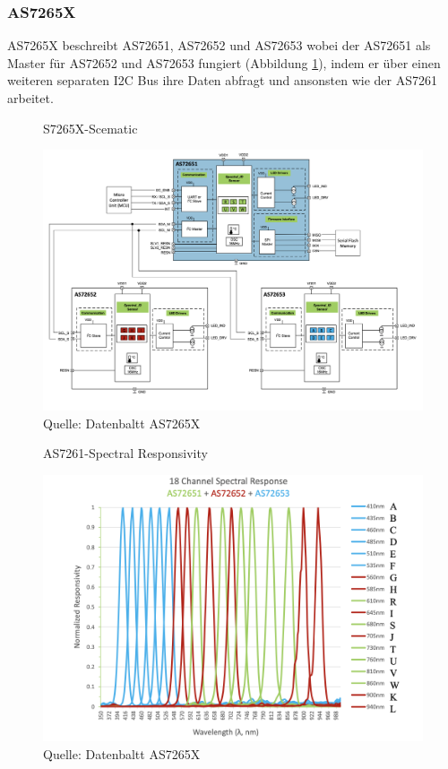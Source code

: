 \subsubsection{AS7265X}\label{AS7265X}
AS7265X beschreibt AS72651, AS72652 und AS72653 wobei der AS72651 als Master für AS72652 und AS72653 fungiert (Abbildung \ref{fig:S7265X-Scematic}), indem er über einen weiteren separaten I2C Bus ihre Daten abfragt und ansonsten wie der AS7261 arbeitet.

\begin{figure}[H]
  \centering
    \caption{S7265X-Scematic}
 \includegraphics[width=0.9\linewidth]{img/AS7265X-Scematic.png}
   \caption*{Quelle: Datenbaltt AS7265X}
  \label{fig:S7265X-Scematic}
\end{figure}


\begin{figure}[H]
  \centering
  \caption{AS7261-Spectral Responsivity}
 \includegraphics[width=0.9\linewidth]{img/AS7265X-Spectral_Responsivity.png}
  \caption*{Quelle: Datenbaltt AS7265X}
  \label{fig:AS7261-Spectral_Responsivity}
\end{figure}

